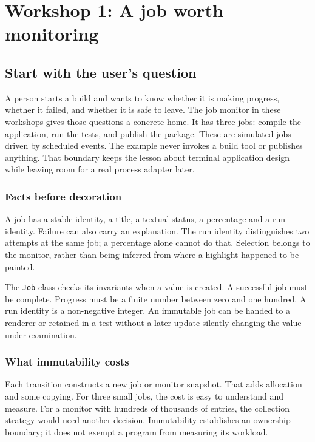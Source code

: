 \chapter{Workshop 1: A job worth monitoring}\label{workshop-01}

\section{Start with the user's question}

A person starts a build and wants to know whether it is making progress, whether it failed, and whether it is safe to leave. The job monitor in these workshops gives those questions a concrete home. It has three jobs: compile the application, run the tests, and publish the package. These are simulated jobs driven by scheduled events. The example never invokes a build tool or publishes anything. That boundary keeps the lesson about terminal application design while leaving room for a real process adapter later.

\subsection{Facts before decoration}

A job has a stable identity, a title, a textual status, a percentage and a run identity. Failure can also carry an explanation. The run identity distinguishes two attempts at the same job; a percentage alone cannot do that. Selection belongs to the monitor, rather than being inferred from where a highlight happened to be painted.

The \texttt{Job} class checks its invariants when a value is created. A successful job must be complete. Progress must be a finite number between zero and one hundred. A run identity is a non-negative integer. An immutable job can be handed to a renderer or retained in a test without a later update silently changing the value under examination.


\subsection{What immutability costs}

Each transition constructs a new job or monitor snapshot. That adds allocation and some copying. For three small jobs, the cost is easy to understand and measure. For a monitor with hundreds of thousands of entries, the collection strategy would need another decision. Immutability establishes an ownership boundary; it does not exempt a program from measuring its workload.


